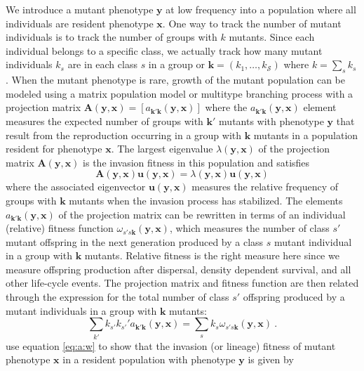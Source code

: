 \documentclass[11pt]{article}
\renewcommand{\vec}[1]{\symbf{#1}}
\newcommand{\eig}{\lambda}
\newcommand{\numc}{\mathcal{S}}
\begin{document}
We introduce a mutant phenotype $\vec{y}$ at low frequency into a population where all individuals are resident phenotype $\vec{x}$. One way to track the number of mutant individuals is to track the number of groups with $k$ mutants. Since each individual belongs to a specific class, we actually track how many mutant individuals $k_{s}$ are in each class $s$ in a group or $\vec{k} = (k_{1},\ldots,k_{\numc})$ where $k = \sum_{s} k_{s}$. When the mutant phenotype is rare, growth of the mutant population can be modeled using a matrix population model \cite{Caswell:2006} or multitype branching process \cite{Kimmel:Axelrod:2015} with a projection matrix $\vec{A}(\vec{y}, \vec{x}) = [a_{\vec{k}'\vec{k}}(\vec{y}, \vec{x})]$ where the $a_{\vec{k}'\vec{k}}(\vec{y}, \vec{x})$ element measures the expected number of groups with $\vec{k}'$ mutants with phenotype $\vec{y}$ that result from the reproduction occurring in a group with $\vec{k}$ mutants in a population resident for phenotype $\vec{x}$. The largest eigenvalue $\eig(\vec{y}, \vec{x})$ of the projection matrix $\vec{A}(\vec{y}, \vec{x})$ is the invasion fitness in this population and satisfies
\begin{equation}
  \label{eq:Au:eigu}
  \vec{A}(\vec{y}, \vec{x}) \vec{u}(\vec{y}, \vec{x}) = \eig(\vec{y}, \vec{x}) \vec{u}(\vec{y}, \vec{x})
\end{equation}
where the associated eigenvector $\vec{u}(\vec{y}, \vec{x})$ measures the relative frequency of groups with $\vec{k}$ mutants when the invasion process has stabilized. The elements $a_{\vec{k}'\vec{k}}(\vec{y}, \vec{x})$ of the projection matrix can be rewritten in terms of an individual (relative) fitness function $\omega_{s's\vec{k}}(\vec{y}, \vec{x})$, which measures the number of class $s'$ mutant offspring in the next generation produced by a class $s$ mutant individual in a group with $\vec{k}$ mutants. Relative fitness is the right measure here since we measure offspring production after dispersal, density dependent survival, and all other life-cycle events. The projection matrix and fitness function are then related through the expression for the total number of class $s'$ offspring produced by a mutant individuals in a group with $\vec{k}$ mutants:
\begin{equation}
  \label{eq:a:w}
  \sum_{k'} k_{s'} k_{s'}' a_{\vec{k}'\vec{k}}(\vec{y}, \vec{x}) = \sum_{s} k_{s} \omega_{s's\vec{k}}(\vec{y}, \vec{x}) \: .
\end{equation}
\citeauthor{Lehmann:Mullon:2016} \cite{Lehmann:Mullon:2016,Lehmann:Rousset:2020} use equation \eqref{eq:a:w} to show that the invasion (or lineage) fitness of mutant phenotype $\vec{x}$ in a resident population with phenotype $\vec{y}$ is given by
\end{document}
